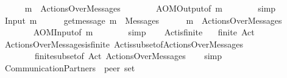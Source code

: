 \begin{isabellebody}
\ \ \ \ \isamarkupfalse%
\ {\isachardoublequoteopen}{\isacharbang}{\kern0pt}{\isasymlangle}m{\isasymrangle}\ {\isasymin}\ ActionsOverMessages{\isachardoublequoteclose}\isanewline
\ \ \ \ \ \ \isamarkupfalse%
\ AOMOutput{\isacharbrackleft}{\kern0pt}of\ m{\isacharbrackright}{\kern0pt}\isanewline
\ \ \ \ \ \ \isamarkupfalse%
\ simp\isanewline
\ \ \isamarkupfalse%
\isanewline
\ \ \ \ \isamarkupfalse%
\ {\isacharparenleft}{\kern0pt}Input\ m{\isacharparenright}{\kern0pt}\isanewline
\ \ \ \ \isamarkupfalse%
\ {\isachardoublequoteopen}get{\isacharunderscore}{\kern0pt}message\ {\isacharparenleft}{\kern0pt}{\isacharquery}{\kern0pt}{\isasymlangle}m{\isasymrangle}{\isacharparenright}{\kern0pt}\ {\isasymin}\ Messages{\isachardoublequoteclose}\isanewline
\ \ \ \ \isamarkupfalse%
\ {\isachardoublequoteopen}{\isacharquery}{\kern0pt}{\isasymlangle}m{\isasymrangle}\ {\isasymin}\ ActionsOverMessages{\isachardoublequoteclose}\isanewline
\ \ \ \ \ \ \isamarkupfalse%
\ AOMInput{\isacharbrackleft}{\kern0pt}of\ m{\isacharbrackright}{\kern0pt}\isanewline
\ \ \ \ \ \ \isamarkupfalse%
\ simp\isanewline
\ \ \isamarkupfalse%
\isanewline
{}\isamarkupfalse%
%
\endisatagproof
{\isafoldproof}%
%
\isadelimproof
\isanewline
%
\endisadelimproof
\isanewline
{}\isamarkupfalse%
\ Act{\isacharunderscore}{\kern0pt}is{\isacharunderscore}{\kern0pt}finite{\isacharcolon}{\kern0pt}\isanewline
\ \ \ {\isachardoublequoteopen}finite\ Act{\isachardoublequoteclose}\isanewline
%
\isadelimproof
\ \ %
\endisadelimproof
%
\isatagproof
{}\isamarkupfalse%
\ ActionsOverMessages{\isacharunderscore}{\kern0pt}is{\isacharunderscore}{\kern0pt}finite\ Act{\isacharunderscore}{\kern0pt}is{\isacharunderscore}{\kern0pt}subset{\isacharunderscore}{\kern0pt}of{\isacharunderscore}{\kern0pt}ActionsOverMessages\isanewline
\ \ \ \ \ \ \ \ finite{\isacharunderscore}{\kern0pt}subset{\isacharbrackleft}{\kern0pt}of\ Act\ ActionsOverMessages{\isacharbrackright}{\kern0pt}\isanewline
\ \ \isamarkupfalse%
\ simp%
\endisatagproof
{\isafoldproof}%
%
\isadelimproof
\isanewline
%
\endisadelimproof
\isanewline
{}\isamarkupfalse%
\ CommunicationPartners\ {\isacharcolon}{\kern0pt}{\isacharcolon}{\kern0pt}\ {\isachardoublequoteopen}{\isacharprime}{\kern0pt}peer\ set{\isachardoublequoteclose}\ \isanewline

\end{isabellebody}
